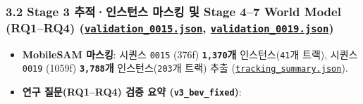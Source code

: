 \documentclass[10.5pt,a4paper]{article}
\begin{document}
\subsubsection{3.2 Stage 3 추적·인스턴스 마스킹 및 Stage 4--7 World Model (RQ1--RQ4) (\href{https://github.com/Heisnotanimposter/Totalcare\_autonomous\_driving\_Yolov5/blob/main/results/v3\_bev\_fixed/world\_outputs/validation\_0015.json}{\texttt{validation\_\allowbreak{}0015.\allowbreak{}json}}, \href{https://github.com/Heisnotanimposter/Totalcare\_autonomous\_driving\_Yolov5/blob/main/results/v3\_bev\_fixed/world\_outputs/validation\_0019.json}{\texttt{validation\_\allowbreak{}0019.\allowbreak{}json}})}

\begin{itemize}[leftmargin=1.5em,itemsep=2pt]
\item \textbf{MobileSAM 마스킹}: 시퀀스 \texttt{0015} (376f) \textbf{\texttt{1,\allowbreak{}370}개} 인스턴스(\texttt{41}개 트랙), 시퀀스 \texttt{0019} (1059f) \textbf{\texttt{3,\allowbreak{}788}개} 인스턴스(\texttt{203}개 트랙) 추출 (\href{https://github.com/Heisnotanimposter/Totalcare\_autonomous\_driving\_Yolov5/blob/main/results/v2\_improved/outputs/tracking\_summary.json}{\texttt{tracking\_\allowbreak{}summary.\allowbreak{}json}}).
\item \textbf{연구 질문(RQ1--RQ4) 검증 요약 (\texttt{v3\_\allowbreak{}bev\_\allowbreak{}fixed})}:
\end{itemize}
\end{document}
